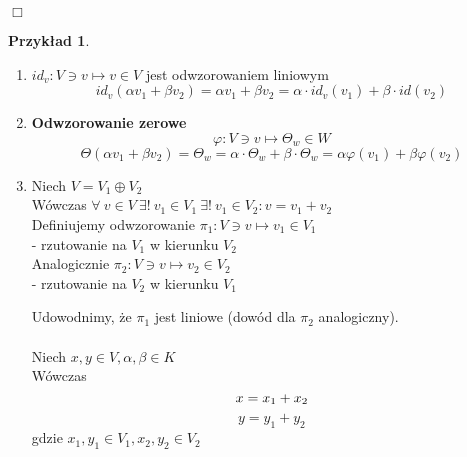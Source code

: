 \documentclass[a5paper,8pt]{article}
\newtheorem{example}{Przykład}[section]
\newcommand\tab[1][1cm]{\hspace*{#1}}
\begin{document}
    \begin{flushright}
        $ \Box $
    \end{flushright}

    \begin{example}
    \end{example}

    \begin{enumerate}[label=\textbf{\arabic*})]
        \item
            $ id_v: V \ni v \longmapsto v \in V $ jest odwzorowaniem liniowym
            \begin{equation*}
                id_v(\alpha v_1 + \beta v_2) = \alpha v_1 + \beta v_2
                = \alpha \cdot id_v (v_1) + \beta \cdot id(v_2)
            \end{equation*}
        \item
            \textbf{Odwzorowanie zerowe} \\
            \begin{equation*}
                \varphi: V \ni v \longmapsto \Theta_w \in W
            \end{equation*}
            \begin{equation*}
                \Theta(\alpha v_1 + \beta v_2) = \Theta_w
                = \alpha \cdot \Theta_w + \beta \cdot \Theta_w
                = \alpha \varphi(v_1) + \beta \varphi(v_2)
            \end{equation*}
        \item
            Niech $ V = V_1 \oplus V_2 $ \\
            Wówczas $ \forall ~v \in V ~ \exists! ~ v_1 \in V_1 ~ \exists! ~ v_1 \in V_2:
            v = v_1 + v_2 $ \\

            Definiujemy odwzorowanie $ \pi_1 : V \ni v \longmapsto v_1 \in V_1 $ \\
            \tab - rzutowanie na $ V_1 $ w kierunku $ V_2 $ \\

            Analogicznie $ \pi_2 : V \ni v \longmapsto v_2 \in V_2 $ \\
            \tab - rzutowanie na $ V_2 $ w kierunku $ V_1 $ \\

            \newpage

            Udowodnimy, że $\pi_1$ jest liniowe (dowód dla $\pi_2$ analogiczny).\\\\
            Niech $ x, y \in V, \alpha , \beta \in K $\\
            Wówczas \\
            \begin{equation*}
                x = x_1 + x_2 \\
            \end{equation*}
            \begin{equation*}
                y = y_1 + y_2
            \end{equation*}
                gdzie $ x_1, y_1 \in V_1, x_2, y_2 \in V_2 $


\end{enumerate}
\end{document}
